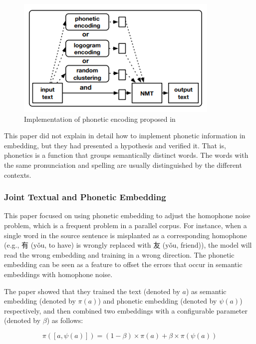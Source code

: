 \begin{figure}[h]
	\centering
	\includegraphics[scale=0.9]{../images/phonetic_encoding.png}
	\caption{Implementation of phonetic encoding proposed in \cite{khan2019diversity}}
	\label{fig:phonetic1}
\end{figure}

This paper did not explain in detail how to implement phonetic information in embedding, but they had presented a hypothesis and verified it. That is, phonetics is a function that groups semantically distinct words. The words with the same pronunciation and spelling are usually distinguished by the different contexts.

\newpage

\subsubsection{Joint Textual and Phonetic Embedding}

This paper \cite{liu-etal-2019-robust} focused on using phonetic embedding to adjust the homophone noise problem, which is a frequent problem in a parallel corpus. For instance, when a single word in the source sentence is misplanted as a corresponding homophone (e.g., 有 (yǒu, to have) is wrongly replaced with 友 (yǒu, friend)), the model will read the wrong embedding and training in a wrong direction. The phonetic embedding can be seen as a feature to offset the errors that occur in semantic embeddings with homophone noise.

The paper showed that they trained the text (denoted by $a$) as semantic embedding (denoted by $\pi(a)$) and phonetic embedding (denoted by $\psi(a)$) respectively, and then combined two embeddings with a configurable parameter (denoted by $\beta$) as follows:

\begin{equation}
	\pi([a, \psi(a)]) = (1-\beta) \times \pi(a) + \beta \times \pi(\psi(a)) 
\end{equation}

